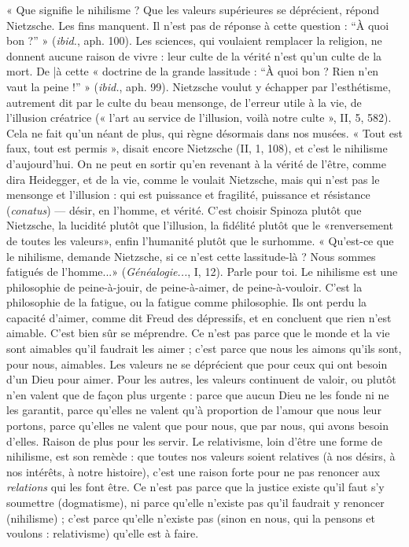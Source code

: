 « Que signifie le nihilisme ? Que les valeurs supérieures se déprécient,
répond Nietzsche. Les fins manquent. Il n’est pas de réponse à cette question :
“À quoi bon ?” » ({\it ibid.}, aph. 100). Les sciences, qui voulaient remplacer la religion,
ne donnent aucune raison de vivre : leur culte de la vérité n’est qu’un
culte de la mort. De |à cette « doctrine de la grande lassitude : “À quoi bon ?
Rien n’en vaut la peine !” » ({\it ibid.}, aph. 99). Nietzsche voulut y échapper par
l’esthétisme, autrement dit par le culte du beau mensonge, de l’erreur utile à la
vie, de l'illusion créatrice (« l’art au service de l'illusion, voilà notre culte », II,
5, 582). Cela ne fait qu’un néant de plus, qui règne désormais dans nos musées.
« Tout est faux, tout est permis », disait encore Nietzsche (II, 1, 108), et c’est
le nihilisme d’aujourd’hui. On ne peut en sortir qu’en revenant à la vérité de
l'être, comme dira Heidegger, et de la vie, comme le voulait Nietzsche, mais
qui n’est pas le mensonge et l'illusion : qui est puissance et fragilité, puissance
et résistance ({\it conatus}) — désir, en l’homme, et vérité. C’est choisir Spinoza
plutôt que Nietzsche, la lucidité plutôt que l'illusion, la fidélité plutôt que le
«renversement de toutes les valeurs», enfin l’humanité plutôt que le
surhomme. « Qu'est-ce que le nihilisme, demande Nietzsche, si ce n’est cette
lassitude-là ? Nous sommes fatigués de l’homme...» ({\it Généalogie...}, I, 12).
Parle pour toi. Le nihilisme est une philosophie de peine-à-jouir, de peine-à-aimer,
de peine-à-vouloir. C’est la philosophie de la fatigue, ou la fatigue
comme philosophie. Ils ont perdu la capacité d’aimer, comme dit Freud des
dépressifs, et en concluent que rien n’est aimable. C’est bien sûr se méprendre.
Ce n’est pas parce que le monde et la vie sont aimables qu’il faudrait les aimer ;
c’est parce que nous les aimons qu’ils sont, pour nous, aimables. Les valeurs ne
se déprécient que pour ceux qui ont besoin d’un Dieu pour aimer. Pour les
autres, les valeurs continuent de valoir, ou plutôt n’en valent que de façon plus
urgente : parce que aucun Dieu ne les fonde ni ne les garantit, parce qu’elles ne
valent qu’à proportion de l'amour que nous leur portons, parce qu’elles ne
valent que pour nous, que par nous, qui avons besoin d’elles. Raison de plus
pour les servir. Le relativisme, loin d’être une forme de nihilisme, est son
remède : que toutes nos valeurs soient relatives (à nos désirs, à nos intérêts, à
notre histoire), c’est une raison forte pour ne pas renoncer aux {\it relations} qui les
font être. Ce n’est pas parce que la justice existe qu’il faut s’y soumettre (dogmatisme),
ni parce qu’elle n’existe pas qu’il faudrait y renoncer (nihilisme) ;
c'est parce qu’elle n’existe pas (sinon en nous, qui la pensons et voulons : relativisme)
qu’elle est à faire.

